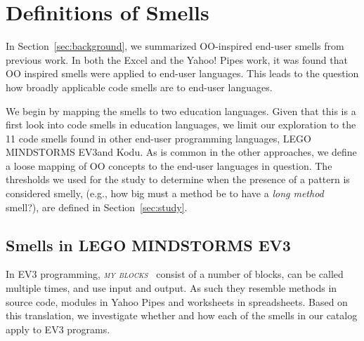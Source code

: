 \documentclass[conference]{IEEEtran}
\newcommand{\ms}{LEGO MINDSTORMS EV3}
\newcommand{\mbs}{\textsc{my blocks}}
\newcommand{\todo}[1]{\textbf{#1}}
\begin{document}



\section{Definitions of Smells}
\label{sec:definition}
In Section~\ref{sec:background}, we summarized OO-inspired end-user smells from previous work. In both the Excel and the Yahoo! Pipes work, it was found that OO inspired smells were applied to end-user languages. This leads to the question how broadly applicable code smells are to end-user languages. 

We begin by mapping the smells to two education languages.  Given that this is a first look into code smells in education languages, we limit our exploration to the 11 code smells found in other end-user programming languages, \ms and Kodu. 
As is common in the other approaches, we define a loose mapping of OO concepts to the end-user languages in question.
The thresholds we used for the study to determine when the presence of a pattern is considered smelly, (e.g., how big must a method be to have a \emph{long method} smell?),  are defined in Section~\ref{sec:study}. 



\subsection{Smells in \ms}
In EV3 programming, \emph{\mbs~} consist of a number of blocks, can be called multiple times, and use input and output. As such they resemble methods in source code, modules in Yahoo Pipes and worksheets in spreadsheets. Based on this translation, we investigate whether and how each of the smells in our catalog  apply to EV3 programs.  
\end{document}
